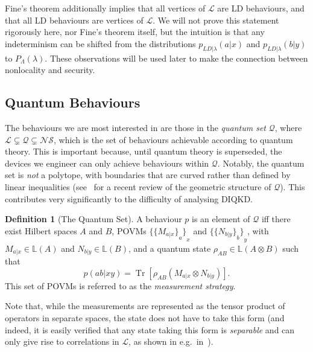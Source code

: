 \documentclass[10pt, a4paper]{article}
\numberwithin{equation}{section} %
\newcounter{stmt} %
\theoremstyle{definition}
\newtheorem{defn}[stmt]{Definition}
\theoremstyle{plain}
\newcommand{\?}{\mathrel{?}} %
\newcommand{\Lin}[1]{\mathbb{L}\left(#1\right)}
\newcommand{\Tr}[2][]{\mathop{\mathrm{Tr}#1}\left[ #2 \right]} %
\newcommand{\Ls}{\mathcal{L}}
\newcommand{\Qs}{\mathcal{Q}}
\newcommand{\NSs}{\mathcal{NS}}
\begin{document}
    Fine's theorem additionally implies that all vertices of \(\Ls\) are LD behaviours, and that all LD behaviours are vertices of \(\Ls\). We will not prove this statement rigorously here, nor Fine's theorem itself, but the intuition is that any indeterminism can be shifted from the distributions \(p_{LD|\lambda}(a|x)\) and \(p_{LD|\lambda}(b|y)\) to \(P_{\Lambda}(\lambda)\). These observations will be used later to make the connection between nonlocality and security.

    \subsection{Quantum Behaviours}\label{sec:nl_Q}

  The behaviours we are most interested in are those in the \emph{quantum set} \(\Qs\), where \(\Ls \subsetneq \Qs \subsetneq \NSs\), which is the set of behaviours achievable according to quantum theory. This is important because, until quantum theory is superseded, the devices we engineer can only achieve behaviours within \(\Qs\). Notably, the quantum set is \emph{not} a polytope, with boundaries that are curved rather than defined by linear inequalities (see~\cite{QGeometry} for a recent review of the geometric structure of \(\Qs\)). This contributes very significantly to the difficulty of analysing DIQKD\@.

    \begin{defn}[The Quantum Set]
      A behaviour \(p\) is an element of \(\Qs\) iff there exist Hilbert spaces \(A\) and \(B\), POVMs \({\{{\{M_{a|x}\}}_a\}}_x\) and \({\{{\{N_{b|y}\}}_b\}}_y\), with \(M_{a|x} \in \Lin{A}\) and \(N_{b|y} \in \Lin{B}\), and a quantum state \(\rho_{AB} \in \Lin{A\otimes{B}}\) such that
      \begin{equation}\label{eqn:Qprob}
        p(ab|xy) = \Tr{\rho_{AB} \left(M_{a|x} \otimes N_{b|y}\right) }.
      \end{equation}
      This set of POVMs is referred to as the \emph{measurement strategy}.
    \end{defn}
    Note that, while the measurements are represented as the tensor product of operators in separate spaces, the state does not have to take this form (and indeed, it is easily verified that any state taking this form is \emph{separable} and can only give rise to correlations in \(\Ls\), as shown in e.g.\ in~\cite[Ax. 3]{FiniteDimNonconvex}).
\end{document}
